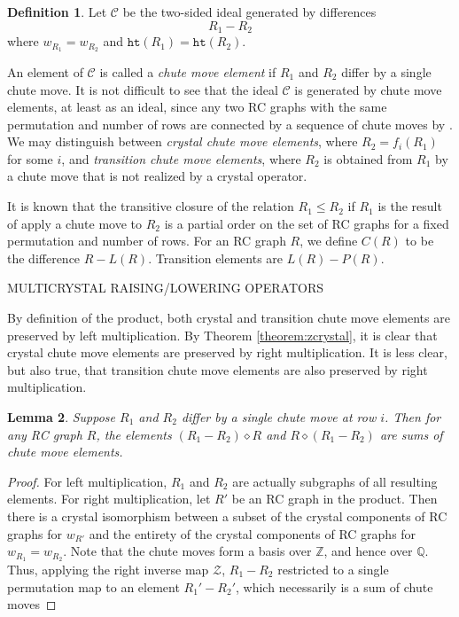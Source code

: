 \documentclass{amsart}
\newtheorem{lemma}{Lemma}[subsection]
\newtheorem{proposition}[lemma]{Proposition}
\theoremstyle{definition}
\newtheorem{definition}[lemma]{Definition}
\theoremstyle{remark}
\numberwithin{equation}{subsection}
\newcommand{\wof}[1]{w_{#1}}
\newcommand{\zeromap}{\mathcal{Z}}
\newcommand{\hr}{\mathtt{ht}}
\begin{document}
\begin{definition}
Let $\mathcal{C}$ be the two-sided ideal generated by differences
$$R_1 - R_2$$
where $\wof{R_1}=\wof{R_2}$ and $\hr(R_1)=\hr(R_2)$. 

An element of $\mathcal{C}$ is called a \emph{chute move element} if $R_1$ and $R_2$ differ by a single chute move. It is not difficult to see that the ideal $\mathcal{C}$ is generated by chute move elements, at least as an ideal, since any two RC graphs with the same permutation and number of rows are connected by a sequence of chute moves by \cite[Theorem~3.7]{bbrc}. We may distinguish between \emph{crystal chute move elements}, where $R_2=f_i(R_1)$ for some $i$, and \emph{transition chute move elements}, where $R_2$ is obtained from $R_1$ by a chute move that is not realized by a crystal operator. 

\end{definition}

It is known that the transitive closure of the relation $R_1\leq R_2$ if $R_1$ is the result of apply a chute move to $R_2$ is a partial order on the set of RC graphs for a fixed permutation and number of rows. For an RC graph $R$, we define $C(R)$ to be the difference $R - L(R)$. Transition elements are $L(R) - P(R)$.

MULTICRYSTAL RAISING/LOWERING OPERATORS


By definition of the product, both crystal and transition chute move elements are preserved by left multiplication. By Theorem \ref{theorem:zcrystal}, it is clear that crystal chute move elements are preserved by right multiplication. It is less clear, but also true, that transition chute move elements are also preserved by right multiplication. 

\begin{lemma}
Suppose $R_1$ and $R_2$ differ by a single chute move at row $i$. Then for any RC graph $R$, the elements $(R_1 - R_2)\diamond R$ and $R\diamond (R_1 - R_2)$ are sums of chute move elements.
\end{lemma}
\begin{proof}
For left multiplication, $R_1$ and $R_2$ are actually subgraphs of all resulting elements. For right multiplication, let $R'$ be an RC graph in the product. Then there is a crystal isomorphism between a subset of the crystal components of RC graphs for $\wof{R'}$ and the entirety of the crystal components of RC graphs for $\wof{R_1}=\wof{R_2}$. Note that the chute moves form a basis over $\mathbb{Z}$, and hence over $\mathbb{Q}$. Thus, applying the right inverse map $\zeromap$, $R_1 - R_2$ restricted to a single permutation map to an element $R_1' - R_2'$, which necessarily is a sum of chute moves
\end{proof}
\end{document}
